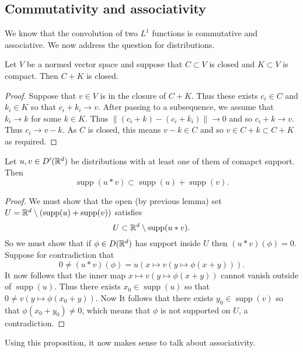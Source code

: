 \documentclass[twoside, a4paper, 10pt]{amsart}
\begin{document}
\subsection{Commutativity and associativity}

We know that the convolution of two $L^1$ functions is commutative and associative. We now address the question for distributions.

\begin{lemma} Let $V$ be a normed vector space and suppose that $C \subset V$ is closed and $K \subset V$ is compact. Then $C+K$ is closed.

\end{lemma}

\begin{proof} Suppose that $v \in V$ is in the closure of $C+K$. Thus these exists $c_i \in C$ and $k_i \in K$ so that $c_i + k_i \to v$. After passing to a subsequence, we assume that $k_i \to k$ for some $k \in K$. Thus $\|(c_i + k) - (c_i + k_i)\| \to 0$ and so $c_i + k \to v$. Thus $c_i \to v - k$. As $C$ is closed, this means $v-k \in C$ and so $v \in C+k \subset C+K$ as required. \end{proof}

\begin{prop} Let $u,v \in D'(\mathbb{R}^d)$ be distributions with at least one of them of comapct support. Then $$\operatorname{supp}(u * v) \subset \operatorname{supp}(u) + \operatorname{supp}(v).$$

\end{prop}

\begin{proof} We must show that the open (by previous lemma) set $U = \mathbb{R}^d \setminus (\operatorname{supp}(u) + \operatorname{supp}(v))$ satisfies $$U \subset \mathbb{R}^d \setminus \operatorname{supp}(u *v).$$ So we must show that if  $\phi \in D(\mathbb{R}^d)$ has support inside $U$ then $(u*v)(\phi) = 0$. Suppose for contradiction that $$0 \neq (u * v) (\phi) = u(x \mapsto v(y \mapsto \phi(x+y))).$$ It now follows that the inner map $x \mapsto v(y \mapsto \phi(x+y))$ cannot vanish outside of $\operatorname{supp}(u)$. Thus there exists $x_0 \in \operatorname{supp}(u)$ so that $0 \neq v(y \mapsto \phi(x_0 +y))$. Now It follows that there exists $y_0 \in \operatorname{supp}(v)$ so that $\phi(x_0 + y_0) \neq 0$, which means that $\phi$ is not supported on $U$, a contradiction. \end{proof}

Using this proposition, it now makes sense to talk about associativity.
\end{document}
